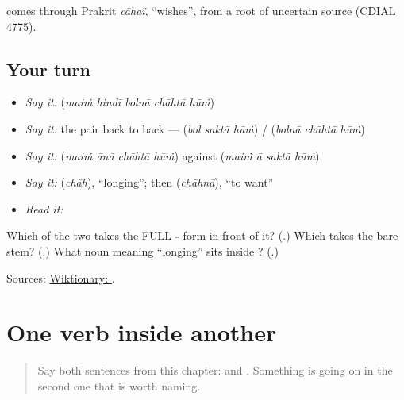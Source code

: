 \textbf{} comes through Prakrit \emph{cāhaï}, \textquotedblleft{}wishes\textquotedblright{}, from a root of uncertain source (CDIAL 4775).

\subsection*{Your turn}
\begin{itemize}
\raggedright
  \item \emph{Say it:} \textbf{    } (\emph{maiṁ hindī bolnā chāhtā hūṁ})
  \item \emph{Say it:} the pair back to back — \textbf{  } (\emph{bol saktā hūṁ}) / \textbf{  } (\emph{bolnā chāhtā hūṁ})
  \item \emph{Say it:} \textbf{   } (\emph{maiṁ ānā chāhtā hūṁ}) against \textbf{   } (\emph{maiṁ ā saktā hūṁ})
  \item \emph{Say it:} \textbf{} (\emph{chāh}), \textquotedblleft{}longing\textquotedblright{}; then \textbf{} (\emph{chāhnā}), \textquotedblleft{}to want\textquotedblright{}
  \item \emph{Read it:} \textbf{}
\end{itemize}

\begin{tcolorbox}[breakable,colback=teal!4,colframe=teal!35!black,title={Before you move on}]
Which of the two takes the FULL \textbf{-} form in front of it? (\textbf{}.) Which takes the bare stem? (\textbf{}.) What noun meaning \textquotedblleft{}longing\textquotedblright{} sits inside \textbf{}? (\textbf{}.)

Sources: \href{https://en.wiktionary.org/wiki/\%E0\%A4\%9A\%E0\%A4\%BE\%E0\%A4\%B9\%E0\%A4\%A8\%E0\%A4\%BE}{Wiktionary: }.
\end{tcolorbox}
\section[\texorpdfstring{… -\hi{ना}, \hi{एक} \hi{क्रिया} … (-nā, ek kriyā ke …)}{… -ना, एक क्रिया … (-nā, ek kriyā ke …)}]{One verb inside another}

\label{lesson:HI-C70-infinitive-object}



\begin{quote}
Say both sentences from this chapter: \textbf{    } and \textbf{    }. Something is going on in the second one that is worth naming.
\end{quote}

